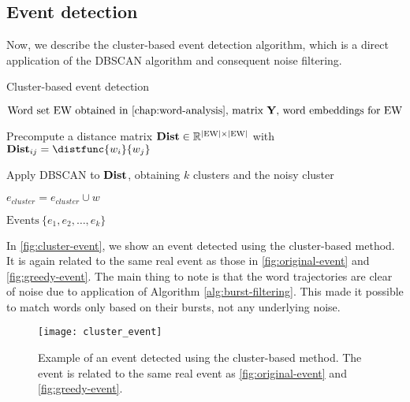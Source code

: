 \subsection{Event detection}
Now, we describe the cluster-based event detection algorithm, which is a direct application of the DBSCAN algorithm and consequent noise filtering.

\begin{algorithm}[H]
\begin{algorithmic}[1]
\caption{Cluster-based event detection}
\Input $\text{Word set EW obtained in \autoref{chap:word-analysis}, matrix } \trajmat \text{, word embeddings for EW}$

\State Precompute a distance matrix $\mathbf{Dist} \in \mathbb{R}^{\left\vert \text{EW} \right\vert \times \left\vert \text{EW} \right\vert}$ with $\distmat_{ij} = \distfunc{w_{i}}{w_{j}}$

\State Apply DBSCAN to $\mathbf{Dist}$, obtaining $k$ clusters and the noisy cluster

		\State $e_{cluster} = e_{cluster} \cup w$
	\EndIf
\EndFor

\Output $\text{Events} ~ \{ e_{1}, e_{2}, \dots, e_{k} \}$
\end{algorithmic}
\end{algorithm}

In \autoref{fig:cluster-event}, we show an event detected using the cluster-based method. It is again related to the same real event as those in \autoref{fig:original-event} and \autoref{fig:greedy-event}. The main thing to note is that the word trajectories are clear of noise due to application of Algorithm \ref{alg:burst-filtering}. This made it possible to match words only based on their bursts, not any underlying noise.

\begin{figure}
  \centering
  \texttt{[image: cluster\_event]}  %
  \caption{Example of an event detected using the cluster-based method. The event is related to the same real event as \autoref{fig:original-event} and \autoref{fig:greedy-event}.}
  \label{fig:cluster-event}
\end{figure}
